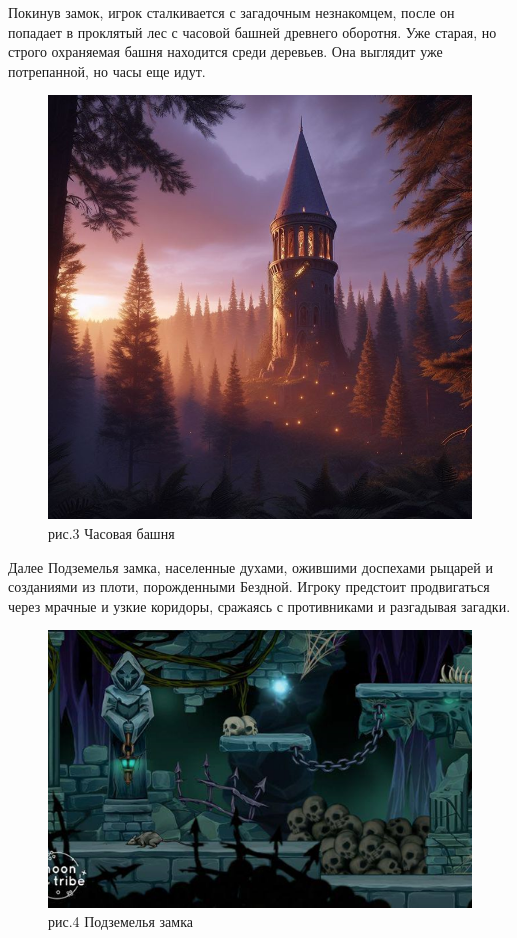 \documentclass{article}
\begin{document}
\par Покинув замок, игрок сталкивается с загадочным незнакомцем, после он попадает в проклятый лес с часовой башней древнего оборотня.
Уже старая, но строго охраняемая башня находится среди деревьев. Она выглядит уже потрепанной, но часы еще идут.
\begin{figure}[h]
    \centering
    \includegraphics[width=0.5\linewidth]{image2.png} \\ рис.3 Часовая башня
    \label{fig:enter-label}
\end{figure}
\par Далее Подземелья замка, населенные духами, ожившими доспехами рыцарей и созданиями из плоти, порожденными Бездной. Игроку предстоит продвигаться через мрачные и узкие коридоры, сражаясь с противниками и разгадывая загадки.
\begin{figure}[h]
    \centering
    \includegraphics[width=0.5\linewidth]{image3.png} \\рис.4 Подземелья замка
    \label{fig:enter-label}
\end{figure}
\end{document}
